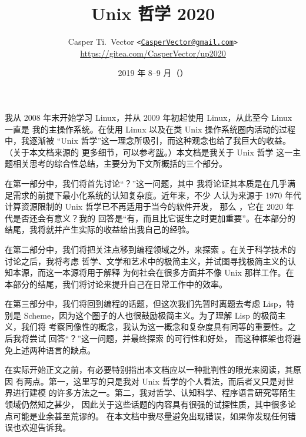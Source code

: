 \documentclass[UTF8]{ctexart}
\begin{document}
\title{\textbf{Unix 哲学 2020}}
\author{%
	Casper Ti.\ Vector
	\texttt{<\url{CasperVector@gmail.com}>}\\
	\url{https://gitea.com/CasperVector/up2020}%
}
\date{2019 年 8--9 月（\docversion）}
\maketitle
\vspace{\baselineskip}
\tableofcontents


我从 2008 年末开始学习 Linux，并从 2009 年初起使用 Linux，从此至今 Linux 一直是
我的主操作系统。在使用 Linux 以及在类 Unix 操作系统圈内活动的过程中，我逐渐被
“Unix 哲学”这一理念所吸引，而这种观念也给了我巨大的收益。（关于本文档来源的
更多细节，可以参考\hyperref[sec:afterword]{跋}。）本文档是我关于 Unix 哲学
这一主题相关思考的综合性总结，主要分为下文所概括的三个部分。

在第一部分中，我们将首先讨论“？”这一问题，其中
我将论证其本质是在几乎满足需求的前提下最小化系统的认知复杂度。近年来，不少
人认为来源于 1970 年代计算资源限制的 Unix 哲学已不再适用于当今的软件开发，
那么 ，它在 2020 年代是否还会有意义？我的
回答是“有，而且比它诞生之时更加重要”。在本部分的结尾，我将就并产生实际的收益给出我自己的经验。

在第二部分中，我们将把关注点移到编程领域之外，来探索 。在关于科学技术的讨论之后，我将考虑
哲学、文学和艺术中的极简主义，并试图寻找极简主义的认知本源，而这一本源将用于解释
为何社会在很多方面并不像 Unix 那样工作。在本部分的结尾，我们将讨论来提升自己在日常工作中的效率。

在第三部分中，我们将回到编程的话题，但这次我们先暂时离题去考虑 Lisp，特别是
Scheme，因为这个圈子的人也很鼓励极简主义。为了理解 Lisp 的极简主义，我们将
考察同像性的概念，我认为这一概念和复杂度具有同等的重要性。之后我将尝试
回答“？”这一问题，并最终探索%
的可行性和好处，
而这种框架也将避免上述两种语言的缺点。

在实际开始正文之前，有必要特别指出本文档应以一种批判性的眼光来阅读，其原因
有两点。第一，这里写的只是我对 Unix 哲学的个人看法，而后者又只是对世界进行建模
的许多方法之一。第二，我对哲学、认知科学、程序语言研究等陌生领域仍然知之甚少，
因此关于这些话题的内容具有很强的试探性质，其中很多论点可能是业余甚至荒谬的。
在本文档中我尽量避免出现错误，如果你发现任何错误也欢迎告诉我。
\end{document}

